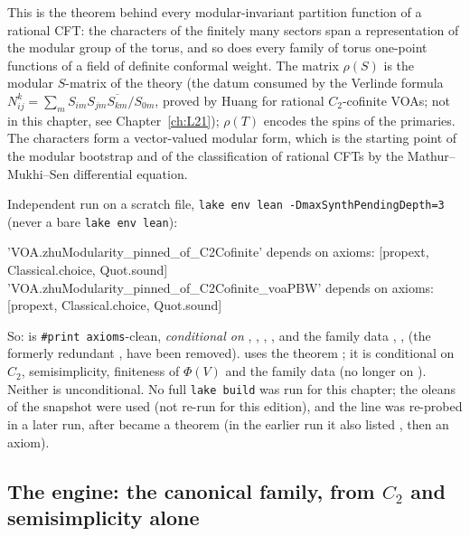\begin{physics}
This is the theorem behind every modular-invariant partition function of a rational CFT: the characters of the finitely
many sectors span a representation of the modular group of the torus, and so does every family of torus one-point
functions of a field of definite conformal weight. The matrix $\rho(S)$ is the modular $S$-matrix of the theory (the
datum consumed by the Verlinde formula $N_{ij}^{k}=\sum_m S_{im}S_{jm}\overline{S_{km}}/S_{0m}$, proved by Huang for
rational $C_2$-cofinite VOAs; not in this chapter, see Chapter~\ref{ch:L21}); $\rho(T)$ encodes the spins of the primaries. The characters form a vector-valued
modular form, which is the starting point of the modular bootstrap and of the classification of rational CFTs by the
Mathur--Mukhi--Sen differential equation.
\end{physics}

\begin{status}
Independent run on a scratch file, \texttt{lake env lean -DmaxSynthPendingDepth=3} (never a bare \texttt{lake env lean}):
\begin{plaincode}
'VOA.zhuModularity_pinned_of_C2Cofinite' depends on axioms: [propext, Classical.choice, Quot.sound]
'VOA.zhuModularity_pinned_of_C2Cofinite_voaPBW' depends on axioms: [propext, Classical.choice, Quot.sound]
\end{plaincode}
So: \allowbreak{}\allowbreak{} is \texttt{\#print axioms}-clean, \emph{conditional on} ,
, , , and the family data , , 
(the formerly redundant ,  have been removed). \allowbreak{}\allowbreak{} uses the theorem
; it is conditional on $C_2$, semisimplicity, finiteness of $\Phi(V)$ and the family data (no longer on
). Neither is unconditional. No full \texttt{lake build} was run for this chapter; the oleans of
the snapshot were used (not re-run for this edition), and the  line was re-probed in a later run, after
 became a theorem (in the earlier run it also listed , then an axiom).
\end{status}

\subsection{The engine: the canonical family, from \texorpdfstring{$C_2$}{C2} and semisimplicity alone}\label{l15:sec:canonical}

